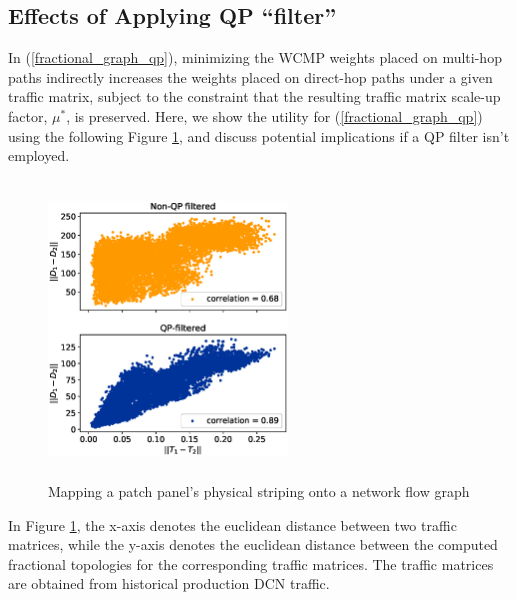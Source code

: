 \documentclass[sigconf]{acmart}
\theoremstyle{definition}
\begin{document}
\begin{appendices}
\subsection{Effects of Applying QP ``filter''}
In (\ref{fractional_graph_qp}), minimizing the WCMP weights placed on multi-hop paths indirectly increases the weights placed on direct-hop paths under a given traffic matrix, subject to the constraint that the resulting traffic matrix scale-up factor, $\mu^*$, is preserved. Here, we show the utility for (\ref{fractional_graph_qp}) using the following Figure \ref{fig:qp_filter_vs_no_filter}, and discuss potential implications if a QP filter isn't employed.

\begin{figure}[ht!]
    \centering
    \includegraphics[width=2.5in,height=3.1in,trim={1.7cm 1.5cm 1.7cm 0.6cm}]{./figures/qp_filter_corr.eps}
    \caption{Mapping a patch panel's physical striping onto a network flow graph}
    \label{fig:qp_filter_vs_no_filter}
\end{figure}
In Figure \ref{fig:qp_filter_vs_no_filter}, the x-axis denotes the euclidean distance between two traffic matrices, while the y-axis denotes the euclidean distance between the computed fractional topologies for the corresponding traffic matrices. The traffic matrices are obtained from historical production DCN traffic.


\end{appendices}
\end{document}
